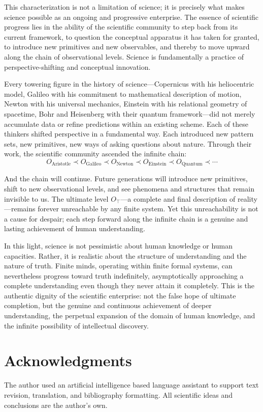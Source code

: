 \documentclass[11pt]{article}
\begin{document}
This characterization is not a limitation of science; it is precisely what makes science possible as an ongoing and progressive enterprise. The essence of scientific progress lies in the ability of the scientific community to step back from its current framework, to question the conceptual apparatus it has taken for granted, to introduce new primitives and new observables, and thereby to move upward along the chain of observational levels. Science is fundamentally a practice of perspective-shifting and conceptual innovation.

Every towering figure in the history of science—Copernicus with his heliocentric model, Galileo with his commitment to mathematical description of motion, Newton with his universal mechanics, Einstein with his relational geometry of spacetime, Bohr and Heisenberg with their quantum framework—did not merely accumulate data or refine predictions within an existing scheme. Each of these thinkers shifted perspective in a fundamental way. Each introduced new pattern sets, new primitives, new ways of asking questions about nature. Through their work, the scientific community ascended the infinite chain:
\begin{equation}
O_{\text{Aristotle}} \prec O_{\text{Galileo}} \prec O_{\text{Newton}} \prec O_{\text{Einstein}} \prec O_{\text{Quantum}} \prec \cdots
\end{equation}

And the chain will continue. Future generations will introduce new primitives, shift to new observational levels, and see phenomena and structures that remain invisible to us. The ultimate level $O_\top$—a complete and final description of reality—remains forever unreachable by any finite system. Yet this unreachability is not a cause for despair; each step forward along the infinite chain is a genuine and lasting achievement of human understanding.

In this light, science is not pessimistic about human knowledge or human capacities. Rather, it is realistic about the structure of understanding and the nature of truth. Finite minds, operating within finite formal systems, can nevertheless progress toward truth indefinitely, asymptotically approaching a complete understanding even though they never attain it completely. This is the authentic dignity of the scientific enterprise: not the false hope of ultimate completion, but the genuine and continuous achievement of deeper understanding, the perpetual expansion of the domain of human knowledge, and the infinite possibility of intellectual discovery.


\section{Acknowledgments}
The author used an artificial intelligence based language assistant to
support text revision, translation, and bibliography formatting. All
scientific ideas and conclusions are the author's own.
\end{document}
